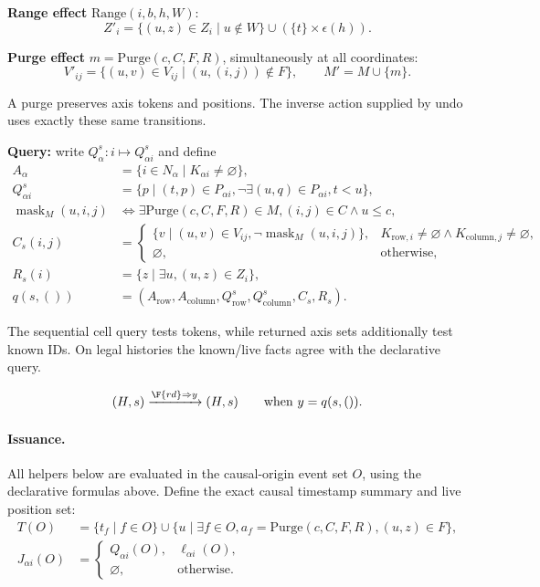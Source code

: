 \textbf{Range effect} $\mathrm{Range}(i,b,h,W)$:
\[
Z'_i=\{(u,z)\in Z_i\mid u\notin W\}\cup(\{t\}\times\epsilon(h)).
\]

\textbf{Purge effect} $m=\mathrm{Purge}(c,C,F,R)$, simultaneously at all coordinates:
\[
V'_{ij}=\{(u,v)\in V_{ij}\mid(u,(i,j))\notin F\},\qquad M'=M\cup\{m\}.
\]

A purge preserves axis tokens and positions. The inverse action supplied by undo uses exactly these same transitions.

\textbf{Query:} write $Q^s_\alpha:i\mapsto Q^s_{\alpha i}$ and define
\[
\begin{aligned}A_\alpha&=\{i\in N_\alpha\mid K_{\alpha i}\ne\varnothing\},\\Q^s_{\alpha i}&=\{p\mid(t,p)\in P_{\alpha i},\neg\exists(u,q)\in P_{\alpha i},t<u\},\\\operatorname{mask}_M(u,i,j)&\iff\exists\mathrm{Purge}(c,C,F,R)\in M,(i,j)\in C\land u\le c,\\C_s(i,j)&=\begin{cases}\{v\mid(u,v)\in V_{ij},\neg\operatorname{mask}_M(u,i,j)\},&K_{\mathrm{row},i}\ne\varnothing\land K_{\mathrm{column},j}\ne\varnothing,\\\varnothing,&\text{otherwise},\end{cases}\\R_s(i)&=\{z\mid\exists u,(u,z)\in Z_i\},\\q(s,())&=(A_{\mathrm{row}},A_{\mathrm{column}},Q^s_{\mathrm{row}},Q^s_{\mathrm{column}},C_s,R_s).\end{aligned}
\]

The sequential cell query tests tokens, while returned axis sets additionally test known IDs. On legal histories the known/live facts agree with the declarative query.

\[
(H,s)\xrightarrow{\F{rd}\Rightarrow y}(H,s)\qquad\text{when }y=q(s,()).
\]

\paragraph{Issuance.}
All helpers below are evaluated in the causal-origin event set $O$, using the declarative formulas above. Define the exact causal timestamp summary and live position set:
\[
\begin{aligned}T(O)&=\{t_f\mid f\in O\}\cup\{u\mid\exists f\in O,a_f=\mathrm{Purge}(c,C,F,R),(u,z)\in F\},\\J_{\alpha i}(O)&=\begin{cases}Q_{\alpha i}(O),&\ell_{\alpha i}(O),\\\varnothing,&\text{otherwise}.\end{cases}\end{aligned}
\]

